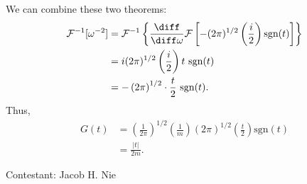 \documentclass[12pt]{article}
\begin{document}
We can combine these two theorems:
\begin{align*}
	\mathcal{F}^{-1}[\omega^{-2}] &= \mathcal{F}^{-1} \left\{ \frac{\diff}{\diff \omega} \mathcal{F}\left[ -(2\pi)^{1/2} \left( \frac{i}{2} \right)\text{sgn}(t) \right] \right\} \\
				      &= i (2\pi)^{1/2} \left( \frac{i}{2} \right) t \ \text{sgn}(t) \\
				      &= -\left( 2\pi\right)^{1/2} \cdot \frac{t}{2} \ \text{sgn}(t).
\end{align*}
Thus,
\begin{align*}
	G(t) &= \left( \frac{1}{2\pi} \right)^{1/2} \left( \frac{1}{m} \right) \left( 2\pi \right)^{1/2} \left( \frac{t}{2} \right)\text{sgn}(t) \\
	     &= \frac{|t|}{2m}.
\end{align*}






\vspace{1cm}

\hfill Contestant: Jacob H. Nie
\end{document}
